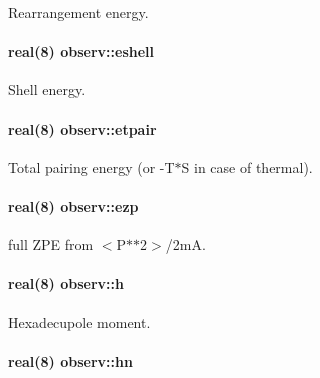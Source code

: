 Rearrangement energy. 

\paragraph[{\texorpdfstring{eshell}{eshell}}]{\setlength{\rightskip}{0pt plus 5cm}real(8) observ\+::eshell}\hypertarget{namespaceobserv_ac8fdfe12d0195f54b5270f0787d8a4be}{}\label{namespaceobserv_ac8fdfe12d0195f54b5270f0787d8a4be}


Shell energy. 

\paragraph[{\texorpdfstring{etpair}{etpair}}]{\setlength{\rightskip}{0pt plus 5cm}real(8) observ\+::etpair}\hypertarget{namespaceobserv_ac535470bfdf0cb2be9051d1ad7f2b4bf}{}\label{namespaceobserv_ac535470bfdf0cb2be9051d1ad7f2b4bf}


Total pairing energy (or -\/\+T$\ast$S in case of thermal). 

\paragraph[{\texorpdfstring{ezp}{ezp}}]{\setlength{\rightskip}{0pt plus 5cm}real(8) observ\+::ezp}\hypertarget{namespaceobserv_a0de483117299fa6f8284416a0706a75e}{}\label{namespaceobserv_a0de483117299fa6f8284416a0706a75e}


full Z\+PE from $<$P$\ast$$\ast$2$>$/2mA. 

\paragraph[{\texorpdfstring{h}{h}}]{\setlength{\rightskip}{0pt plus 5cm}real(8) observ\+::h}\hypertarget{namespaceobserv_aee3c6d228879577edf3210d8798f5759}{}\label{namespaceobserv_aee3c6d228879577edf3210d8798f5759}


Hexadecupole moment. 

\paragraph[{\texorpdfstring{hn}{hn}}]{\setlength{\rightskip}{0pt plus 5cm}real(8) observ\+::hn}\hypertarget{namespaceobserv_a7f7bef99d120f798dbf50695ea51cf6f}{}\label{namespaceobserv_a7f7bef99d120f798dbf50695ea51cf6f}


